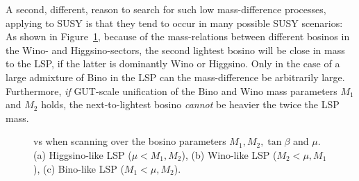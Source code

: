 A second, different, reason to search for such low mass-difference
processes, applying to SUSY
is that they tend to occur in many possible SUSY scenarios:
As shown in Figure~\ref{fig:searches_tomohikoscan},
because of the mass-relations between different bosinos in the Wino- and
Higgsino-sectors,
the second lightest bosino will be close in mass to the LSP,
if the latter is dominantly Wino or Higgsino.
Only in the case of a large admixture of Bino in the LSP
can the mass-difference be arbitrarily large.
Furthermore, 
{\it if} GUT-scale unification of  the Bino and Wino mass 
parameters $M_1$ and $M_2$ holds,
the next-to-lightest bosino {\it cannot} be 
heavier the twice the LSP mass\cite{Choi:2001ww}.
\begin{figure}[]
  \begin{center}
  \end{center}
  \caption{\label{fig:searches_tomohikoscan}  vs  when scanning over the bosino parameters
$M_1 , M_2, \tan{\beta}$ and $\mu$. (a) Higgsino-like LSP ($\mu < M_1 , M_2$), 
(b)  Wino-like LSP ($M_2 < \mu , M_1$), (c) Bino-like LSP ($M_1 < \mu , M_2$). }
\end{figure}

